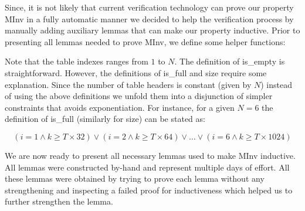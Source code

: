 Since, it is not likely that current verification technology can prove
our property \textsf{MInv} in a fully automatic manner we decided to help the
verification process by manually adding auxiliary lemmas that can make
our property inductive.
%
Prior to presenting all lemmas needed to prove \textsf{MInv}, we
define some helper functions:

\begin{minipage}{\linewidth}
\vspace{3mm}
\vspace{3mm}
\end{minipage}


\noindent Note that the table indexes ranges from $1$ to $N$. The
definition of \textsf{is\_empty} is straightforward. However, the
definitions of \textsf{is\_full} and \textsf{size} require some
explanation. Since the number of table headers is constant (given by
$N$) instead of using the above definitions we unfold them into a
disjunction of simpler constraints that avoids exponentiation. For
instance, for a given $N=6$ the definition of \textsf{is\_full}
(similarly for \textsf{size}) can be stated as:

\[ (i=1 \wedge k \geq T \times 32) \vee (i=2 \wedge k \geq T \times 64) \vee \ldots \vee (i=6 \wedge k \geq T \times 1024) \]

We are now ready to present all necessary lemmas used to make
\textsf{MInv} inductive. All lemmas were constructed by-hand and
represent multiple days of effort. All these lemmas were obtained by
trying to prove each lemma without any strengthening and inspecting a
failed proof for inductiveness which helped us to further strengthen
the lemma.

